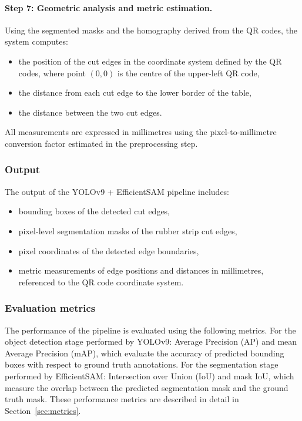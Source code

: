 \documentclass[11pt]{article}
\begin{document}
\paragraph{Step 7: Geometric analysis and metric estimation.}
Using the segmented masks and the homography derived from the QR codes, the system 
computes:
\begin{itemize}
    \item the position of the cut edges in the coordinate system defined by the 
    QR codes, where point $(0, 0)$ is the centre of the upper-left QR code,
    \item the distance from each cut edge to the lower border of the table,
    \item the distance between the two cut edges.
\end{itemize}
All measurements are expressed in millimetres using the pixel-to-millimetre conversion 
factor estimated in the preprocessing step.

\subsubsection{Output}

The output of the YOLOv9 + EfficientSAM pipeline includes:
\begin{itemize}
    \item bounding boxes of the detected cut edges,
    \item pixel-level segmentation masks of the rubber strip cut edges,
    \item pixel coordinates of the detected edge boundaries,
    \item metric measurements of edge positions and distances in millimetres, 
    referenced to the QR code coordinate system.
\end{itemize}

\subsubsection{Evaluation metrics}

The performance of the pipeline is evaluated using the following metrics. For the 
object detection stage performed by YOLOv9: Average Precision (AP) and mean Average 
Precision (mAP), which evaluate the accuracy of predicted bounding boxes with respect 
to ground truth annotations. For the segmentation stage performed by EfficientSAM: 
Intersection over Union (IoU) and mask IoU, which measure the overlap between the 
predicted segmentation mask and the ground truth mask. These performance metrics are 
described in detail in Section~\ref{sec:metrics}.
\end{document}
